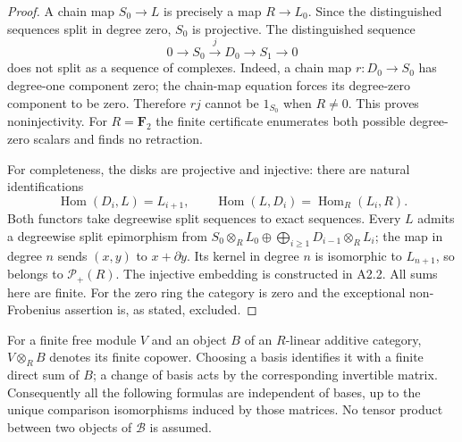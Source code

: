 \begin{proof}
A chain map $S_0\to L$ is precisely a map $R\to L_0$.  Since the
distinguished sequences split in degree zero, $S_0$ is projective.
The distinguished sequence
\[
 0\longrightarrow S_0\xrightarrow{j}D_0
   \longrightarrow S_1\longrightarrow0
\]
does not split as a sequence of complexes.  Indeed, a chain map
$r:D_0\to S_0$ has degree-one component zero; the chain-map equation
forces its degree-zero component to be zero.  Therefore $rj$ cannot be
$1_{S_0}$ when $R\ne0$.  This proves noninjectivity.  For $R=\mathbf F_2$
the finite certificate enumerates both possible degree-zero scalars and
finds no retraction.

For completeness, the disks are projective and injective: there are
natural identifications
\[
 \operatorname{Hom}(D_i,L)=L_{i+1},\qquad
 \operatorname{Hom}(L,D_i)=\operatorname{Hom}_R(L_i,R).
\]
Both functors take degreewise split sequences to exact sequences.
Every $L$ admits a degreewise split epimorphism from
$S_0\otimes_R L_0\oplus\bigoplus_{i\geq1}D_{i-1}\otimes_RL_i$;
the map in degree $n$ sends $(x,y)$ to $x+\partial y$.
Its kernel in degree $n$ is isomorphic to $L_{n+1}$, so belongs to
$\mathcal P_+(R)$.  The injective embedding is constructed in A2.2.
All sums here are finite.  For the zero ring the category is zero and
the exceptional non-Frobenius assertion is, as stated, excluded.
\end{proof}

For a finite free module $V$ and an object $B$ of an $R$-linear additive
category, $V\otimes_R B$ denotes its finite copower.  Choosing a basis
identifies it with a finite direct sum of $B$; a change of basis acts by
the corresponding invertible matrix.  Consequently all the following
formulas are independent of bases, up to the unique comparison
isomorphisms induced by those matrices.  No tensor product between two
objects of $\mathcal B$ is assumed.

